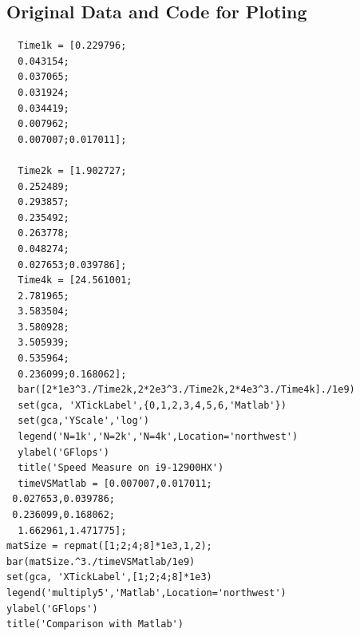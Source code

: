 \documentclass{article}
\begin{document}
\subsection{Original Data and Code for Ploting}
\begin{verbatim}
  Time1k = [0.229796;
  0.043154;
  0.037065;
  0.031924;
  0.034419;
  0.007962;
  0.007007;0.017011];
  
  Time2k = [1.902727;
  0.252489;
  0.293857;
  0.235492;
  0.263778;
  0.048274;
  0.027653;0.039786];
  Time4k = [24.561001;
  2.781965;
  3.583504;
  3.580928;
  3.505939;
  0.535964;
  0.236099;0.168062];
  bar([2*1e3^3./Time2k,2*2e3^3./Time2k,2*4e3^3./Time4k]./1e9)
  set(gca, 'XTickLabel',{0,1,2,3,4,5,6,'Matlab'})
  set(gca,'YScale','log')
  legend('N=1k','N=2k','N=4k',Location='northwest')
  ylabel('GFlops')
  title('Speed Measure on i9-12900HX')
  timeVSMatlab = [0.007007,0.017011;
 0.027653,0.039786;
 0.236099,0.168062;
  1.662961,1.471775];
matSize = repmat([1;2;4;8]*1e3,1,2);
bar(matSize.^3./timeVSMatlab/1e9)
set(gca, 'XTickLabel',[1;2;4;8]*1e3)
legend('multiply5','Matlab',Location='northwest')
ylabel('GFlops')
title('Comparison with Matlab')
\end{verbatim}
\end{document}

